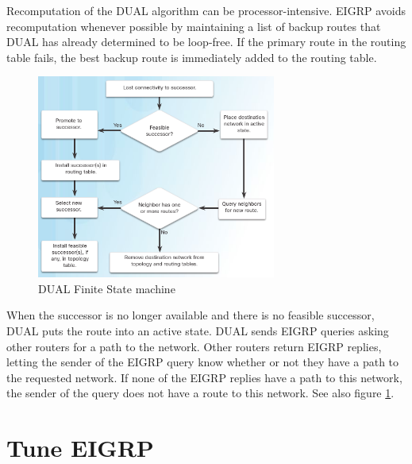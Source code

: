 Recomputation of the DUAL algorithm can be processor-intensive. EIGRP avoids recomputation whenever possible by maintaining a list of backup routes that DUAL has already determined to be loop-free. If the primary route in the routing table fails, the best backup route is immediately added to the routing table. \par
\begin{figure}[hbtp]
\centering
\includegraphics[width=0.7\textwidth]{pictures/EIGRP-DUAL.png}
\caption{DUAL Finite State machine} \label{EIGRP-DUAL}
\end{figure}
When the successor is no longer available and there is no feasible successor, DUAL puts the route into an active state. DUAL sends EIGRP queries asking other routers for a path to the network. Other routers return EIGRP replies, letting the sender of the EIGRP query know whether or not they have a path to the requested network. If none of the EIGRP replies have a path to this network, the sender of the query does not have a route to this network. See also figure \ref{EIGRP-DUAL}.
\section{Tune EIGRP}
